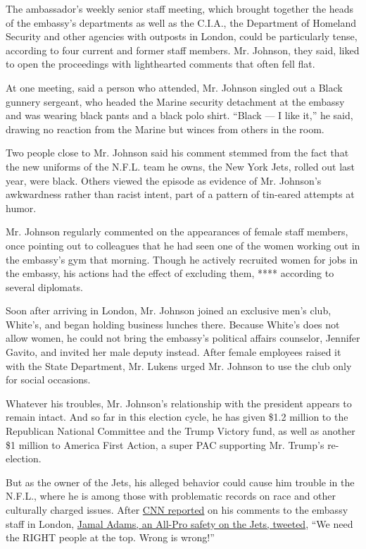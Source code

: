 The ambassador's weekly senior staff meeting, which brought together the
heads of the embassy's departments as well as the C.I.A., the Department
of Homeland Security and other agencies with outposts in London, could
be particularly tense, according to four current and former staff
members. Mr. Johnson, they said, liked to open the proceedings with
lighthearted comments that often fell flat.

At one meeting, said a person who attended, Mr. Johnson singled out a
Black gunnery sergeant, who headed the Marine security detachment at the
embassy and was wearing black pants and a black polo shirt. ``Black ---
I like it,'' he said, drawing no reaction from the Marine but winces
from others in the room.

Two people close to Mr. Johnson said his comment stemmed from the fact
that the new uniforms of the N.F.L. team he owns, the New York Jets,
rolled out last year, were black. Others viewed the episode as evidence
of Mr. Johnson's awkwardness rather than racist intent, part of a
pattern of tin-eared attempts at humor.

Mr. Johnson regularly commented on the appearances of female staff
members, once pointing out to colleagues that he had seen one of the
women working out in the embassy's gym that morning. Though he actively
recruited women for jobs in the embassy, his actions had the effect of
excluding them, **** according to several diplomats.

Soon after arriving in London, Mr. Johnson joined an exclusive men's
club, White's, and began holding business lunches there. Because White's
does not allow women, he could not bring the embassy's political affairs
counselor, Jennifer Gavito, and invited her male deputy instead. After
female employees raised it with the State Department, Mr. Lukens urged
Mr. Johnson to use the club only for social occasions.

Whatever his troubles, Mr. Johnson's relationship with the president
appears to remain intact. And so far in this election cycle, he has
given \$1.2 million to the Republican National Committee and the Trump
Victory fund, as well as another \$1 million to America First Action, a
super PAC supporting Mr. Trump's re-election.

But as the owner of the Jets, his alleged behavior could cause him
trouble in the N.F.L., where he is among those with problematic records
on race and other culturally charged issues. After
\href{https://www.cnn.com/2020/07/22/politics/woody-johnson-oig-report/index.html}{CNN
reported} on his comments to the embassy staff in London,
\href{https://twitter.com/Prez/status/1285983250628767744?s=20}{Jamal
Adams, an All-Pro safety on the Jets, tweeted}, ``We need the RIGHT
people at the top. Wrong is wrong!''

